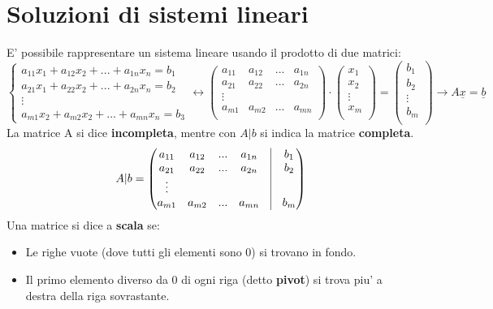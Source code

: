 \documentclass{report}
\begin{document}
\section{Soluzioni di sistemi lineari}
E' possibile rappresentare un sistema lineare usando il prodotto di due matrici:
\[
  \begin{cases}
    a_{11}x_1 + a_{12}x_2 + ... + a_{1n}x_n = b_1\\
    a_{21}x_1 + a_{22}x_2 + ... + a_{2n}x_n = b_2\\
    \vdots\\
    a_{m1}x_2 + a_{m2}x_2 + ... + a_{mn}x_n= b_3
  \end{cases} \leftrightarrow \begin{pmatrix}
  a_{11} & a_{12} & ... & a_{1n}\\
  a_{21} & a_{22} & ... & a_{2n}\\
  \vdots\\
  a_{m1} & a_{m2} & ... & a_{mn}\\
  \end{pmatrix} \cdot 
  \begin{pmatrix}
  x_1\\
  x_2\\
  \vdots\\
  x_m\\
  \end{pmatrix} = 
  \begin{pmatrix}
  b_1\\
  b_2\\
  \vdots \\
  b_m \\
  \end{pmatrix} \to A\underline{x}=\underline{b}
\]
La matrice A si dice \textbf{incompleta}, mentre con $A|b$ si indica la matrice \textbf{completa}.
\[
A|b = 
\begin{pmatrix}
  a_{11} & a_{12} & ... & a_{1n} & \vline & b_1\\
  a_{21} & a_{22} & ... & a_{2n} & \vline & b_2\\
  \vdots & & & & \vline & \\
  a_{m1} & a_{m2} & ... & a_{mn} & \vline & b_m\\
\end{pmatrix}
\]
Una matrice si dice a \textbf{scala} se:
\begin{itemize}
  \item Le righe vuote (dove tutti gli elementi sono 0) si trovano in fondo.
  \item Il primo elemento diverso da 0 di ogni riga (detto \textbf{pivot}) si trova piu' a destra della riga sovrastante.
\end{itemize}
\end{document}
